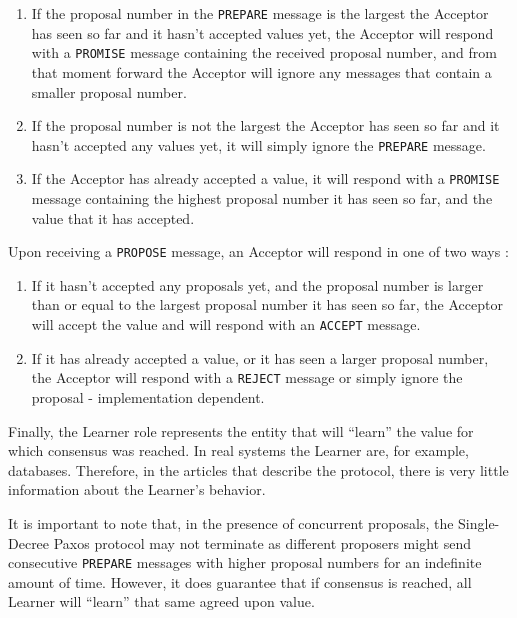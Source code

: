 \begin{enumerate}
  \item If the proposal number in the \texttt{PREPARE} message is the largest the Acceptor has seen so far and it hasn’t accepted values yet, the Acceptor will respond with a \texttt{PROMISE} message containing the received proposal number, and from that moment forward the Acceptor will ignore any messages that contain a smaller proposal number.
  \item If the proposal number is not the largest the Acceptor has seen so far and it hasn’t accepted any values yet, it will simply ignore the \texttt{PREPARE} message.
  \item If the Acceptor has already accepted a value, it will respond with a \texttt{PROMISE} message containing the highest proposal number it has seen so far, and the value that it has accepted.
\end{enumerate}

Upon receiving a \texttt{PROPOSE} message, an Acceptor will respond in one of two ways \cite{paxos_made_simple}:

\begin{enumerate}
  \item If it hasn’t accepted any proposals yet, and the proposal number is larger than or equal to the largest proposal number it has seen so far, the Acceptor will accept the value and will respond with an \texttt{ACCEPT} message.
  \item If it has already accepted a value, or it has seen a larger proposal number, the Acceptor will respond with a \texttt{REJECT} message or simply ignore the proposal - implementation dependent.
\end{enumerate}

Finally, the Learner role represents the entity that will “learn” the value for which consensus was reached. In real systems the Learner are, for example, databases. Therefore, in the articles that describe the protocol, there is very little information about the Learner’s behavior.


It is important to note that, in the presence of concurrent proposals, the Single-Decree Paxos protocol may not terminate as different proposers might send consecutive \texttt{PREPARE} messages with higher proposal numbers for an indefinite amount of time. However, it does guarantee that if consensus is reached, all Learner will “learn” that same agreed upon value.




